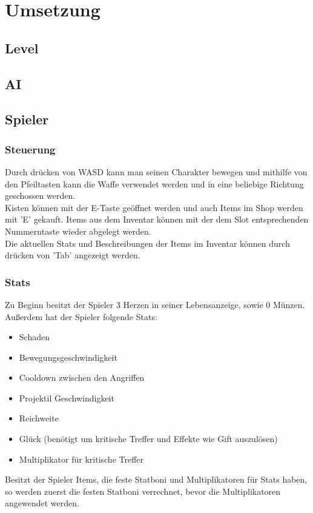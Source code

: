 \section{Umsetzung}

\subsection{Level}

\subsection{AI}

\subsection{Spieler}
\subsubsection{Steuerung}
Durch drücken von WASD kann man seinen Charakter bewegen und mithilfe von den Pfeiltasten kann die Waffe verwendet werden und in eine beliebige Richtung geschossen werden. \\
Kisten können mit der E-Taste geöffnet werden und auch Items im Shop werden mit 'E' gekauft. Items aus dem Inventar können mit der dem Slot entsprechenden Nummerntaste wieder abgelegt werden. \\
Die aktuellen Stats und Beschreibungen der Items im Inventar können durch drücken von 'Tab' angezeigt werden.

\subsubsection{Stats}
Zu Beginn besitzt der Spieler 3 Herzen in seiner Lebensanzeige, sowie 0 Münzen. Außerdem hat der Spieler folgende Stats:
\begin{itemize}
\item Schaden
\item Bewegungsgeschwindigkeit
\item Cooldown zwischen den Angriffen
\item Projektil Geschwindigkeit
\item Reichweite
\item Glück (benötigt um kritische Treffer und Effekte wie Gift auszulösen)
\item Multiplikator für kritische Treffer
\end{itemize}
Besitzt der Spieler Items, die feste Statboni und Multiplikatoren für Stats haben, so werden zuerst die festen Statboni verrechnet, bevor die Multiplikatoren angewendet werden.

